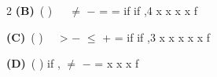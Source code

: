 \documentclass[a4paper,10pt,twoside]{article}
\begin{document}
\begin{multicols}{2}
\textbf{(B)}~( ) \newline  \newline $\ne$ \newline − \newline = \newline =  \newline if   \newline if \newline ,4 \newline x \newline x \newline x \newline x \newline f\par\vspace{2pt}\noindent
\textbf{(C)}~( ) \newline  \newline > \newline − \newline $\le$ \newline + \newline =  \newline if   \newline if \newline ,3 \newline x \newline x \newline x \newline x \newline x \newline f\par\vspace{2pt}\noindent
\textbf{(D)}~( )  \newline if \newline ,    \newline $\ne$ \newline − \newline = \newline x \newline x \newline x \newline f

\end{multicols}
\end{document}
